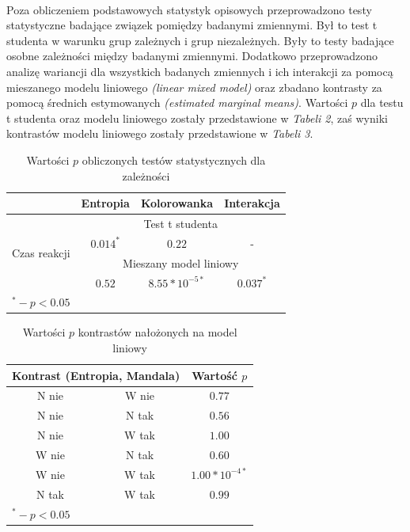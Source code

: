 \documentclass[12pt,a4paper,final,oneside,onecolumn,titlepage]{article}
\begin{document}
\paragraph{}
Poza obliczeniem podstawowych statystyk opisowych przeprowadzono testy statystyczne badające związek pomiędzy badanymi zmiennymi. Był to test t studenta w warunku grup zależnych i grup niezależnych. Były to testy badające osobne zależności między badanymi zmiennymi. Dodatkowo przeprowadzono analizę wariancji dla wszystkich badanych zmiennych i ich interakcji za pomocą mieszanego modelu liniowego \textit{(linear mixed model)} oraz zbadano kontrasty za pomocą średnich estymowanych \textit{(estimated marginal means)}. Wartości $p$ dla testu t studenta oraz modelu liniowego zostały przedstawione w \textit{Tabeli 2}, zaś wyniki kontrastów modelu liniowego zostały przedstawione w \textit{Tabeli 3}.
\begin{table}[H]
\caption{Wartości $p$ obliczonych testów statystycznych dla zależności}
\centering
\begin{tabular}{l c c c}
\hline\hline
 & Entropia & Kolorowanka & Interakcja \\ [0.5ex]
\hline
\multirow{4}{*}{Czas reakcji}& \multicolumn{3}{c}{Test t studenta} \\
 &$0.014^*$&$0.22$&- \\ [3ex]
 & \multicolumn{3}{c}{Mieszany model liniowy}\\
 &$0.52$&$8.55*10^{-5*}$&$0.037^*$ \\
\hline
\multicolumn{4}{l}{\footnotesize{$^{*} - p<0.05$}}
\end{tabular}
\label{Tabela}
\end{table}
\begin{table}[H]
\caption{Wartości $p$ kontrastów nałożonych na model liniowy}
\centering
\begin{tabular}{c c c}
\hline\hline
\multicolumn{2}{c}{Kontrast (Entropia, Mandala)} & Wartość $p$ \\ [0.5ex]
\hline
N nie & W nie & $0.77$ \\
N nie & N tak & $0.56$ \\
N nie & W tak & $1.00$ \\
W nie & N tak & $0.60$ \\
W nie & W tak & $1.00*10^{-4*}$ \\
N tak & W tak & $0.99$ \\
\hline
\multicolumn{3}{l}{\footnotesize{$^{*} - p<0.05$}}
\end{tabular}
\label{Tabela}
\end{table}
\end{document}
